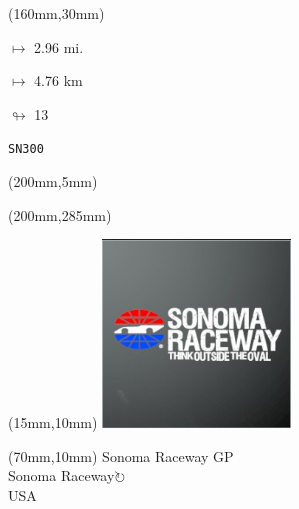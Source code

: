 \begin{textblock*}{40mm}(160mm,30mm)%
\Large
\par$\mapsto$ 2.96 mi.
\par$\mapsto$ 4.76 km
\par$\looparrowright$ 13
\par\hfill\tiny\tt SN300\\
\end{textblock*}
\begin{textblock*}{20mm}(200mm,5mm)%
\fbox{\thepage}
\label{SN300}
\end{textblock*}
\begin{textblock*}{20mm}(200mm,285mm)%
\fbox{\thepage}
\end{textblock*}

\null\newpage
\begin{textblock*}{50mm}(15mm,10mm)%
\includegraphics[width=50mm]{LG/2015-05-20_00096.png}
\end{textblock*}
\begin{textblock*}{130mm}(70mm,10mm)%
{\fontsize{20}{20}\selectfont Sonoma Raceway GP\\}
{\fontsize{16}{16}\selectfont Sonoma Raceway\hfill \Large$\circlearrowright$\\}
{\fontsize{12}{12}\selectfont USA\\}
\end{textblock*}
